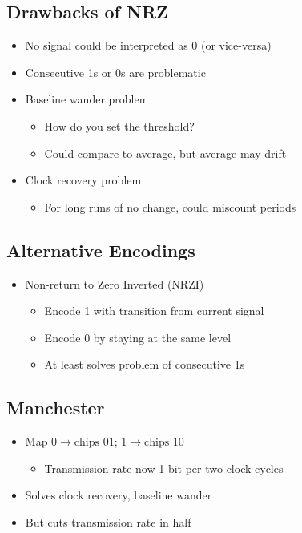 \subsection{Drawbacks of NRZ}
\begin{itemize}[nosep]
    \item No signal could be interpreted as 0 (or vice-versa)
    \item Consecutive 1s or 0s are problematic
    \item Baseline wander problem
          \begin{itemize}[nosep]
              \item How do you set the threshold?
              \item Could compare to average, but average may drift
          \end{itemize}
    \item Clock recovery problem
          \begin{itemize}[nosep]
              \item For long runs of no change, could miscount periods
          \end{itemize}
\end{itemize}

\subsection{Alternative Encodings}
\begin{itemize}[nosep]
    \item Non-return to Zero Inverted (NRZI)
          \begin{itemize}[nosep]
              \item Encode 1 with transition from current signal
              \item Encode 0 by staying at the same level
              \item At least solves problem of consecutive 1s
          \end{itemize}
\end{itemize}

\subsection{Manchester}
\begin{itemize}[nosep]
    \item Map $0\to\text{chips }01$; $1\to\text{chips }10$
          \begin{itemize}[nosep]
              \item Transmission rate now 1 bit per two clock cycles
          \end{itemize}
    \item Solves clock recovery, baseline wander
    \item But cuts transmission rate in half
\end{itemize}

